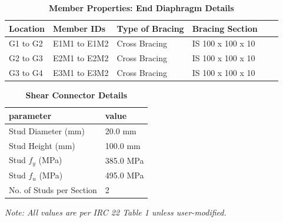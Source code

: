 \documentclass[12pt,a4paper]{report}
\numberwithin{table}{chapter}
\numberwithin{figure}{chapter}
\begin{document}
\vspace{0.4em}
\noindent
\setlength{\tabcolsep}{4pt}
\setlength\LTleft{0pt}
\setlength\LTright{\fill}

\begin{longtable}{|L{2.2cm}|L{2.2cm}|L{3.0cm}|L{2.5cm}|C{1.8cm}|C{1.8cm}|}
\caption{\textbf{Member Properties: End Diaphragm Details}}
\hline
\textbf{Location} & \textbf{Member IDs} & \textbf{Type of Bracing} & \textbf{Bracing Section} \\
\hline
G1 to G2 & E1M1 to E1M2 & Cross Bracing & IS 100 x 100 x 10 \\[6pt]
\hline
G2 to G3 & E2M1 to E2M2 & Cross Bracing & IS 100 x 100 x 10 \\[6pt]
\hline
G3 to G4 & E3M1 to E3M2 & Cross Bracing & IS 100 x 100 x 10 \\[6pt]
\hline
\end{longtable}



\label{subsec:shear-connectors}

\vspace{2.2em}

\vspace{0.4em}
\begin{longtable}{|L{5.5cm}|p{10.0cm}|}
\caption{\textbf{Shear Connector Details}}
\hline
\textbf{parameter} & \textbf{value} \\
\hline
\textnormal{Stud Diameter (mm)} & 20.0 mm \\[6pt]
\hline
\textnormal{Stud Height (mm)} & 100.0 mm \\[6pt]
\hline
\textnormal{Stud $f_y$ (MPa)} & 385.0 MPa \\[6pt]
\hline
\textnormal{Stud $f_u$ (MPa)} & 495.0 MPa \\[6pt]
\hline
\textnormal{No. of Studs per Section} & 2 \\[6pt]
\hline
\end{longtable}



\label{subsec:safety-factors}

\vspace{2.2em}

\vspace{0.3em}
\noindent\textit{Note: All values are per IRC 22 Table 1 unless user-modified.}
\end{document}
